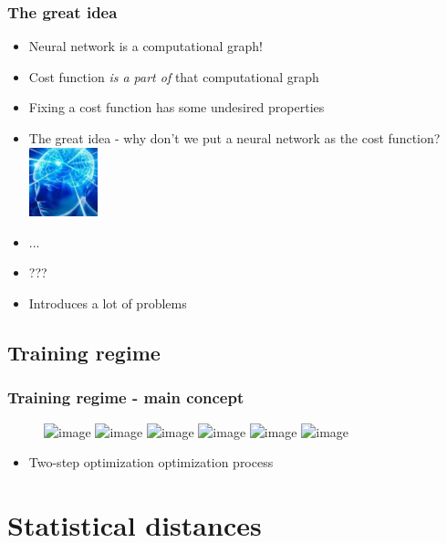 \documentclass{Bredelebeamer}
\begin{document}
\begin{frame}
	\frametitle{The great idea}
	\begin{itemize}[<+->]
		\item Neural network is a computational graph!
		\item Cost function \textit{is a part of} that computational graph
		\item Fixing a cost function has some undesired properties
		\item The great idea - why don't we put a neural network as the cost function? \includegraphics[height=2cm]{expanding_brain.jpeg}
		\item ...
		\item ???
		\item Introduces a lot of problems
	\end{itemize}
\end{frame}

\subsection{Training regime}
\begin{frame}
	\frametitle{Training regime - main concept}
	\begin{figure}[h!]
	\centering
	\includegraphics<1>[width=\textwidth]{gan_optimization/GAN_optimization_1.png}
	\includegraphics<2>[width=\textwidth]{gan_optimization/GAN_optimization_2.png}
	\includegraphics<3>[width=\textwidth]{gan_optimization/GAN_optimization_3.png}
	\includegraphics<4>[width=\textwidth]{gan_optimization/GAN_optimization_4.png}
	\includegraphics<5>[width=\textwidth]{gan_optimization/GAN_optimization_5.png}
	\includegraphics<6->[width=\textwidth]{gan_optimization/GAN_optimization_6.png}
	\end{figure}
	\pause[6]
	\begin{itemize}
		\item Two-step optimization optimization process
	\end{itemize}
\end{frame}

\section{Statistical distances}
\end{document}

